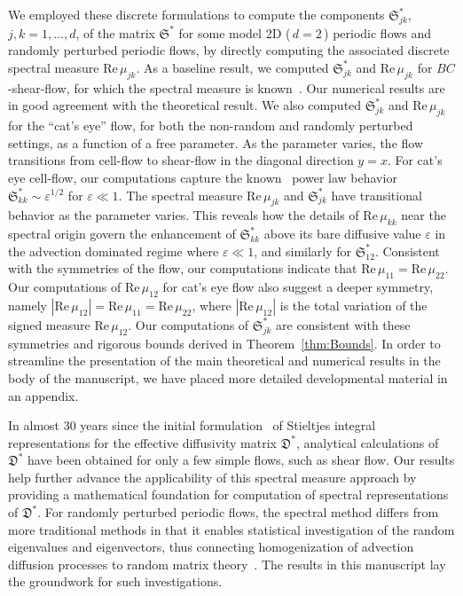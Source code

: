 \documentclass[english,12pt,jmp,graphicx]{revtex4-1}
\newcommand{\thmref}[1]{Theorem~\ref{#1}}
\newcommand{\secref}[1]{Section~\ref{#1}}
\newcommand{\appref}[1]{Appendix~\ref{#1}}
\newcommand{\Sg}{\mathfrak{S}}
\newcommand{\Dg}{\mathfrak{D}}
\newcommand{\Real}{\mbox{Re}\,}
\begin{document}
We employed these discrete formulations
to compute the components 
$\Sg_{jk}^*$, $j,k=1,\ldots,d$, of the matrix $\Sg^*$ for
some model 2D ($\,d=2\,$) periodic flows and randomly perturbed
periodic flows, by directly computing the associated discrete spectral
measure $\Real\mu_{jk}$. As a baseline result, we computed $\Sg_{jk}^*$ and
$\Real\mu_{jk}$ for $BC$-shear-flow, for which the spectral measure is
known~\cite{Avellaneda:CMP-339}. Our numerical results are in good agreement
with the theoretical result. We also computed $\Sg_{jk}^*$ and
$\Real\mu_{jk}$ for the ``cat's eye'' flow, for both the non-random and
randomly perturbed settings, as a function of a free parameter. As the
parameter varies, the flow transitions from cell-flow to shear-flow in
the diagonal direction $y=x$. For cat's eye cell-flow, our
computations capture the
known~\cite{Fannjiang:1994:SIAM_JAM:333,Fannjiang:1997:1033} power law
behavior $\Sg_{kk}^*\sim\varepsilon^{1/2}$ for $\varepsilon\ll1$. 
The spectral measure $\Real\mu_{jk}$ and
$\Sg_{jk}^*$ have transitional behavior as the parameter
varies. This reveals how the details of $\Real\mu_{kk}$ near the
spectral origin govern the enhancement of $\Sg_{kk}^*$ above
its bare diffusive value $\varepsilon$ in the advection dominated
regime where $\varepsilon\ll1$, and similarly for $\Sg_{12}^*$. Consistent
with the symmetries of the flow, our computations indicate that
$\Real\mu_{11}=\Real\mu_{22}$. Our computations of $\Real\mu_{12}$ for
cat's eye flow also suggest a deeper symmetry, namely  
$|\Real\mu_{12}|=\Real\mu_{11}=\Real\mu_{22}$, where $|\Real\mu_{12}|$
is the total   
variation of the signed measure $\Real\mu_{12}$. Our computations of
$\Sg_{jk}^*$ are consistent with these symmetries and rigorous
bounds derived in \thmref{thm:Bounds}. In order to streamline the
presentation of the main theoretical and numerical results in the body
of the manuscript, we have placed more detailed developmental material
in an appendix.



 
In almost 30 years since the initial 
formulation~\cite{Avellaneda:CMP-339,Avellaneda:PRL-753} of Stieltjes
integral representations for the effective diffusivity matrix $\Dg^*$, 
analytical calculations of $\Dg^*$ have been obtained for only a few
simple flows, such as shear flow. Our results
help further advance the applicability of this
spectral measure
approach 
by providing a mathematical foundation
for computation of spectral representations of $\Dg^*$. For randomly
perturbed periodic flows, the spectral method differs from more
traditional methods in that it enables statistical investigation of
the random eigenvalues and eigenvectors, thus connecting homogenization
of advection diffusion processes to random matrix 
theory~\cite{Murphy:PRL:118:036401}. The results in this manuscript
lay the groundwork for such investigations.      
\end{document}
